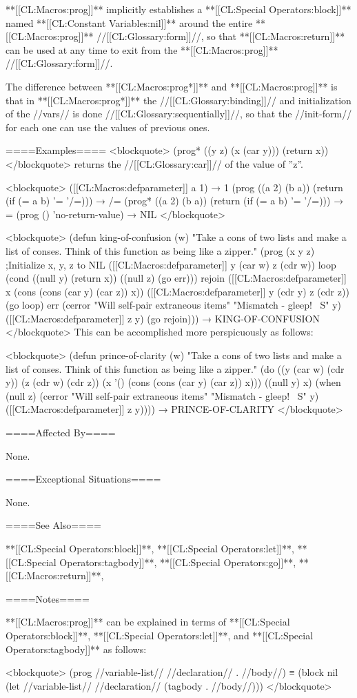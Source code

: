 **[[CL:Macros:prog]]** implicitly establishes a **[[CL:Special Operators:block]]** named **[[CL:Constant Variables:nil]]** around the entire **[[CL:Macros:prog]]** //[[CL:Glossary:form]]//, so that **[[CL:Macros:return]]** can be used at any time to exit from the **[[CL:Macros:prog]]** //[[CL:Glossary:form]]//.

The difference between **[[CL:Macros:prog*]]** and **[[CL:Macros:prog]]** is that in **[[CL:Macros:prog*]]** the //[[CL:Glossary:binding]]// and initialization of the //vars// is done //[[CL:Glossary:sequentially]]//, so that the //init-form// for each one can use the values of previous ones.

====Examples==== <blockquote> (prog* ((y z) (x (car y))) (return x)) </blockquote> returns the //[[CL:Glossary:car]]// of the value of ''z''.

<blockquote> ([[CL:Macros:defparameter]] a 1) → 1 (prog ((a 2) (b a)) (return (if (= a b) '= '/=))) → /= (prog* ((a 2) (b a)) (return (if (= a b) '= '/=))) → = (prog () 'no-return-value) → NIL </blockquote>

<blockquote> (defun king-of-confusion (w) "Take a cons of two lists and make a list of conses. Think of this function as being like a zipper." (prog (x y z) ;Initialize x, y, z to NIL ([[CL:Macros:defparameter]] y (car w) z (cdr w)) loop (cond ((null y) (return x)) ((null z) (go err))) rejoin ([[CL:Macros:defparameter]] x (cons (cons (car y) (car z)) x)) ([[CL:Macros:defparameter]] y (cdr y) z (cdr z)) (go loop) err (cerror "Will self-pair extraneous items" "Mismatch - gleep! ~S" y) ([[CL:Macros:defparameter]] z y) (go rejoin))) → KING-OF-CONFUSION </blockquote> This can be accomplished more perspicuously as follows:

<blockquote> (defun prince-of-clarity (w) "Take a cons of two lists and make a list of conses. Think of this function as being like a zipper." (do ((y (car w) (cdr y)) (z (cdr w) (cdr z)) (x '() (cons (cons (car y) (car z)) x))) ((null y) x) (when (null z) (cerror "Will self-pair extraneous items" "Mismatch - gleep! ~S" y) ([[CL:Macros:defparameter]] z y)))) → PRINCE-OF-CLARITY </blockquote>

====Affected By====

None.

====Exceptional Situations====

None.

====See Also====

**[[CL:Special Operators:block]]**, **[[CL:Special Operators:let]]**, **[[CL:Special Operators:tagbody]]**, **[[CL:Special Operators:go]]**, **[[CL:Macros:return]]**, {\secref\Evaluation}

====Notes====

**[[CL:Macros:prog]]** can be explained in terms of **[[CL:Special Operators:block]]**, **[[CL:Special Operators:let]]**, and **[[CL:Special Operators:tagbody]]** as follows:

<blockquote> (prog //variable-list// //declaration// . //body//) ≡ (block nil (let //variable-list// //declaration// (tagbody . //body//))) </blockquote>

